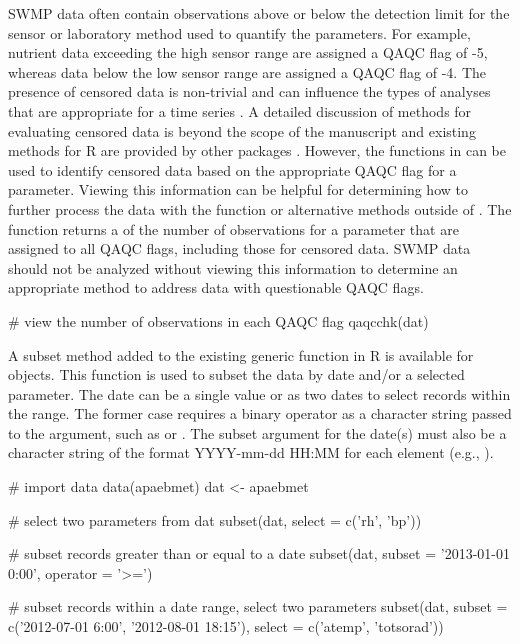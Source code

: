 SWMP data often contain observations above or below the detection limit for the sensor or laboratory method used to quantify the parameters.  For example, nutrient data exceeding the high sensor range are assigned a QAQC flag of -5, whereas data below the low sensor range are assigned a QAQC flag of -4.  The presence of censored data is non-trivial and can influence the types of analyses that are appropriate for a time series \citep{Helsel12}.  A detailed discussion of methods for evaluating censored data is beyond the scope of the manuscript and existing methods for R are provided by other packages \citep[e.g., ,][]{McLeod14}.  However, the functions in  can be used to identify censored data based on the appropriate QAQC flag for a parameter.  Viewing this information can be helpful for determining how to further process the data with the  function or alternative methods outside of .  The  function returns a  of the number of observations for a parameter that are assigned to all QAQC flags, including those for censored data.  SWMP data should not be analyzed without viewing this information to determine an appropriate method to address data with questionable QAQC flags.    

\begin{example}
# view the number of observations in each QAQC flag
qaqcchk(dat)
\end{example}

A subset method added to the existing generic  function in R is available for  objects.  This function is used to subset the data by date and/or a selected parameter.  The date can be a single value or as two dates to select records within the range. The former case requires a binary operator as a character string passed to the  argument, such as  or .  The subset argument for the date(s) must also be a character string of the format YYYY-mm-dd HH:MM for each element (e.g., ). 

\begin{example}
# import data
data(apaebmet)
dat <- apaebmet

# select two parameters from dat
subset(dat, select = c('rh', 'bp'))

# subset records greater than or equal to a date
subset(dat, subset = '2013-01-01 0:00', operator = '>=')

# subset records within a date range, select two parameters
subset(dat, subset = c('2012-07-01 6:00', '2012-08-01 18:15'),
  select = c('atemp', 'totsorad'))
\end{example}

